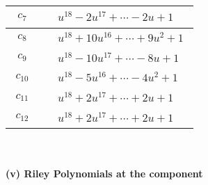 \documentclass[1p]{elsarticle_modified}
\theoremstyle{definition}
\begin{document}
\begin{tabular}{m{50pt}|m{274pt}}
\hline $$\begin{aligned}c_{7}\end{aligned}$$&$\begin{aligned}
&u^{18}-2 u^{17}+\cdots-2 u+1
\end{aligned}$\\
\hline $$\begin{aligned}c_{8}\end{aligned}$$&$\begin{aligned}
&u^{18}+10 u^{16}+\cdots+9 u^2+1
\end{aligned}$\\
\hline $$\begin{aligned}c_{9}\end{aligned}$$&$\begin{aligned}
&u^{18}-10 u^{17}+\cdots-8 u+1
\end{aligned}$\\
\hline $$\begin{aligned}c_{10}\end{aligned}$$&$\begin{aligned}
&u^{18}-5 u^{16}+\cdots-4 u^2+1
\end{aligned}$\\
\hline $$\begin{aligned}c_{11}\end{aligned}$$&$\begin{aligned}
&u^{18}+2 u^{17}+\cdots+2 u+1
\end{aligned}$\\
\hline $$\begin{aligned}c_{12}\end{aligned}$$&$\begin{aligned}
&u^{18}+2 u^{17}+\cdots+2 u+1
\end{aligned}$\\
\hline
\end{tabular}\\~\\
\newpage\renewcommand{\arraystretch}{1}
\flushleft \textbf{(v) Riley Polynomials at the component}\newline \\
\end{document}
